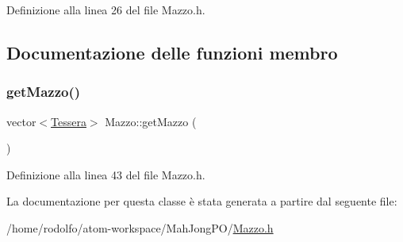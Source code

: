 Definizione alla linea 26 del file Mazzo.\+h.



\subsection{Documentazione delle funzioni membro}
\mbox{\label{class_mazzo_a891bc7fd96f2cfab2f5ba52ce8dd3c89}} 
\subsubsection{\texorpdfstring{get\+Mazzo()}{getMazzo()}}
{\footnotesize\ttfamily vector$<$\hyperlink{class_tessera}{Tessera}$>$ Mazzo\+::get\+Mazzo (\begin{DoxyParamCaption}{ }\end{DoxyParamCaption})\hspace{0.3cm}{\ttfamily [inline]}}



Definizione alla linea 43 del file Mazzo.\+h.



La documentazione per questa classe è stata generata a partire dal seguente file\+:\begin{DoxyCompactItemize}
\item 
/home/rodolfo/atom-\/workspace/\+Mah\+Jong\+P\+O/\hyperlink{_mazzo_8h}{Mazzo.\+h}\end{DoxyCompactItemize}
